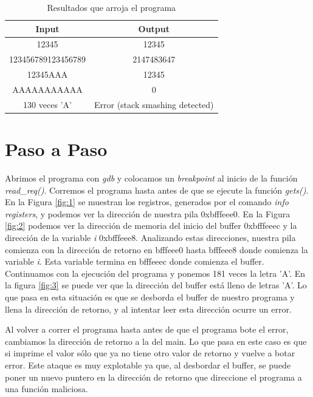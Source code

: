 \documentclass[a4paper,12pt]{article}
\begin{document}
\begin{table}
\begin{center}
 \begin{tabular}{|c|c|}
  \hline
  Input & Output \\
  \hline \hline
  12345 & 12345 \\ \hline
  123456789123456789 & 2147483647 \\ \hline
  12345AAA & 12345 \\ \hline
  AAAAAAAAAAA &  0 \\ \hline
  130 veces 'A' & Error (stack smashing detected) \\ \hline
 \end{tabular}
\end{center}
\caption{Resultados que arroja el programa}
\label{table:res}
\end{table}

\section{Paso a Paso}

Abrimos el programa con \textit{gdb} y colocamos un \textit{breakpoint} al inicio de la función \textit{read\_req()}.
Corremos el programa hasta antes de que se ejecute la función \textit{gets()}. En la Figura \ref{fig:1} se muestran
los registros, generados por el comando \textit{info registers}, y podemos ver la dirección de nuestra pila 0xbfffeee0.
En la Figura \ref{fig:2} podemos ver la dirección de memoria del inicio del buffer 0xbfffeeec y la dirección de la variable
\textit{i} 0xbfffeee8. Analizando estas direcciones, nuestra pila comienza con la dirección de retorno en bfffeee0 hasta
bfffeee8 donde comienza la variable \textit{i}. Esta variable termina en bfffeeec donde comienza el buffer.
Continuamos con la ejecución del programa y ponemos 181 veces la letra 'A'. En la figura \ref{fig:3} se puede ver
que la dirección del buffer está lleno de letras 'A'. Lo que pasa en esta situación es que se desborda el buffer de nuestro
programa y llena la dirección de retorno, y al intentar leer esta dirección ocurre un error. \par

Al volver a correr el programa hasta antes de que el programa bote el error, cambiamos la dirección de retorno a la del main.
Lo que pasa en este caso es que si imprime el valor sólo que ya no tiene otro valor de retorno y vuelve a botar error.
Este ataque es muy explotable ya que, al desbordar el buffer, se puede poner un nuevo puntero en la dirección de retorno que
direccione el programa a una función maliciosa.
\end{document}
